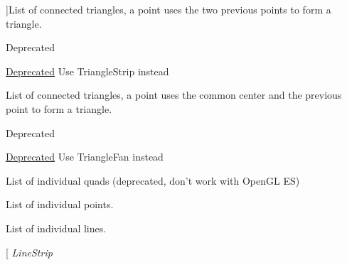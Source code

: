 \begin{Desc}
\begin{description}
{}]List of connected triangles, a point uses the two previous points to form a triangle. \begin{DoxyRefDesc}{Deprecated}
\item[\hyperlink{deprecated__deprecated000003}{Deprecated}]Use Triangle\-Strip instead \end{DoxyRefDesc}
\item[{\em 
\hypertarget{group__graphics_gga5ee56ac1339984909610713096283b1ba698ecd8ec938b4132412b8da44a1a6be}{Triangles\-Fan}\label{group__graphics_gga5ee56ac1339984909610713096283b1ba698ecd8ec938b4132412b8da44a1a6be}
}]List of connected triangles, a point uses the common center and the previous point to form a triangle. \begin{DoxyRefDesc}{Deprecated}
\item[\hyperlink{deprecated__deprecated000004}{Deprecated}]Use Triangle\-Fan instead \end{DoxyRefDesc}
\item[{\em 
\hypertarget{group__graphics_gga5ee56ac1339984909610713096283b1bac968add05250b2cf59350dc68043a3c0}{Quads}\label{group__graphics_gga5ee56ac1339984909610713096283b1bac968add05250b2cf59350dc68043a3c0}
}]List of individual quads (deprecated, don't work with Open\-G\-L E\-S) \item[{\em 
\hypertarget{group__graphics_gga5ee56ac1339984909610713096283b1ba85cf551ca780a29ec5df3ee9fc282c22}{Points}\label{group__graphics_gga5ee56ac1339984909610713096283b1ba85cf551ca780a29ec5df3ee9fc282c22}
}]List of individual points. \item[{\em 
\hypertarget{group__graphics_gga5ee56ac1339984909610713096283b1ba2017328f9eda40a9aade94d5c45d0e8c}{Lines}\label{group__graphics_gga5ee56ac1339984909610713096283b1ba2017328f9eda40a9aade94d5c45d0e8c}
}]List of individual lines. \item[{\em 
\hypertarget{group__graphics_gga5ee56ac1339984909610713096283b1ba14d9eeec2c7c314f239a57bde35949fa}{Line\-Strip}\label{group__graphics_gga5ee56ac1339984909610713096283b1ba14d9eeec2c7c314f239a57bde35949fa}
}
\end{description}
\end{Desc}
